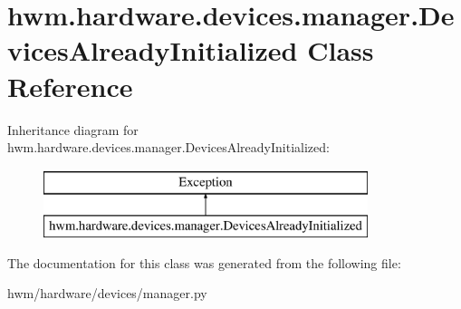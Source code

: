 \hypertarget{classhwm_1_1hardware_1_1devices_1_1manager_1_1_devices_already_initialized}{\section{hwm.\-hardware.\-devices.\-manager.\-Devices\-Already\-Initialized Class Reference}
\label{classhwm_1_1hardware_1_1devices_1_1manager_1_1_devices_already_initialized}
}
Inheritance diagram for hwm.\-hardware.\-devices.\-manager.\-Devices\-Already\-Initialized\-:\begin{figure}[H]
\begin{center}
\leavevmode
\includegraphics[height=2.000000cm]{classhwm_1_1hardware_1_1devices_1_1manager_1_1_devices_already_initialized}
\end{center}
\end{figure}


The documentation for this class was generated from the following file\-:\begin{DoxyCompactItemize}
\item 
hwm/hardware/devices/manager.\-py\end{DoxyCompactItemize}
